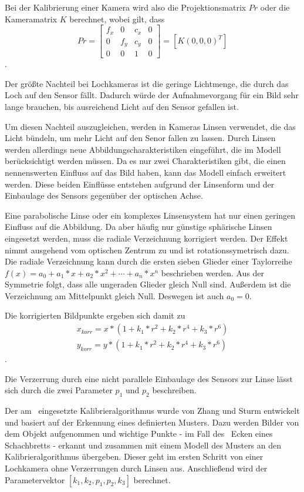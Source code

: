 Bei der Kalibrierung einer Kamera wird also die Projektionsmatrix $Pr$ oder die
Kameramatrix $K$ berechnet, wobei gilt, dass \begin{equation} Pr=
  \begin{bmatrix} f_x&0&c_x&0\\ 0&f_y&c_y&0\\ 0&0&1&0 \end{bmatrix} = \left[K
  \left(0,0,0\right)^T\right] \end{equation}.\cite{Bradski2008}


Der größte Nachteil bei Lochkameras ist die geringe Lichtmenge, die durch das
Loch auf den Sensor fällt. Dadurch würde der Aufnahmevorgang für ein Bild sehr
lange brauchen, bis ausreichend Licht auf den Sensor gefallen ist.

Um diesen Nachteil auszugleichen, werden in Kameras Linsen verwendet, die das
Licht bündeln, um mehr Licht auf den Senor fallen zu lassen. Durch Linsen werden
allerdings neue Abbildungscharakteristiken eingeführt, die im Modell
berücksichtigt werden müssen. Da es nur zwei Charakteristiken gibt, die einen
nennenswerten Einfluss auf das Bild haben, kann das Modell einfach erweitert
werden. Diese beiden Einflüsse entstehen aufgrund der Linsenform und der
Einbaulage des Sensors gegenüber der optischen Achse. 

Eine parabolische Linse oder ein komplexes Linsensystem hat nur einen geringen
Einfluss auf die Abbildung. Da aber häufig nur günstige sphärische Linsen
eingesetzt werden, muss die radiale Verzeichnung korrigiert werden. Der Effekt
nimmt ausgehend vom optischen Zentrum zu und ist rotationssymetrisch dazu. Die
radiale Verzeichnung kann durch die ersten sieben Glieder einer Taylorreihe
$f(x)=a_0+a_1*x+a_2*x^2+\cdots+a_n*x^n$ beschrieben werden. Aus der Symmetrie
folgt, dass alle ungeraden Glieder gleich Null sind. Außerdem ist die
Verzeichnung am Mittelpunkt gleich Null. Deswegen ist auch $a_0=0$.

Die korrigierten Bildpunkte ergeben sich damit zu 
  \begin{align} x_{korr}=x*(1+k_1*r^2+k_2*r^4+k_3*r^6)\\
    y_{korr}=y*(1+k_1*r^2+k_2*r^4+k_3*r^6) \end{align}.

Die Verzerrung durch eine nicht parallele Einbaulage des Sensors zur Linse lässt
sich durch die zwei
Parameter $p_1$ und $p_2$ beschreiben.\cite{Bradski2008}

Der am \cob\ eingesetzte Kalibrieralgorithmus wurde von Zhang und Sturm
entwickelt und basiert auf der Erkennung eines definierten Musters. Dazu werden
Bilder von dem Objekt aufgenommen und wichtige Punkte - im Fall des \cob\ Ecken
eines Schachbretts - erkannt und zusammen mit einem Modell des Musters an den
Kalibrieralgorithmus übergeben. Dieser geht im ersten Schritt von einer
Lochkamera ohne Verzerrungen durch Linsen aus. Anschließend wird der
Parametervektor $\left[k_1,k_2,p_1,p_2,k_3\right]$ berechnet.\cite{zhang2000flexible}


